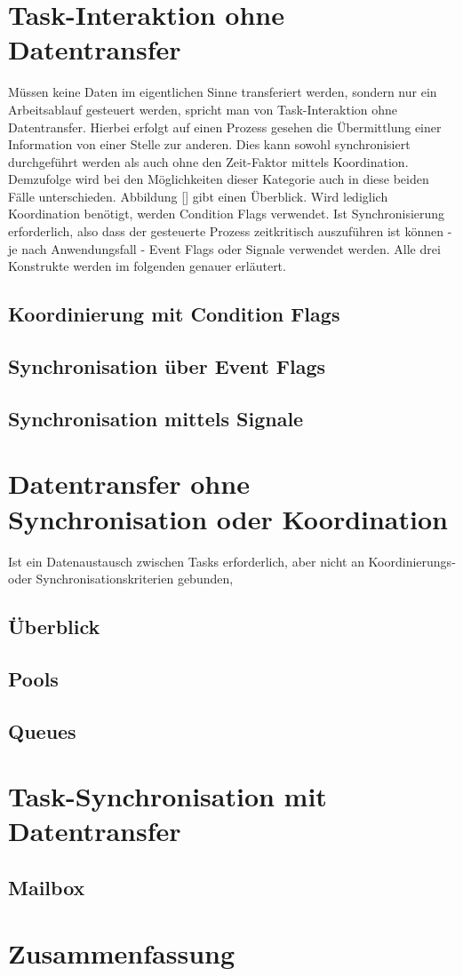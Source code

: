 \documentclass{llncs}
\begin{document}
\section{Task-Interaktion ohne Datentransfer}
Müssen keine Daten im eigentlichen Sinne transferiert werden, sondern nur ein Arbeitsablauf gesteuert werden, spricht man von Task-Interaktion ohne Datentransfer. Hierbei erfolgt auf einen Prozess gesehen die Übermittlung einer Information von einer Stelle zur anderen. Dies kann sowohl synchronisiert durchgeführt werden als auch ohne den Zeit-Faktor mittels Koordination. Demzufolge wird bei den Möglichkeiten dieser Kategorie auch in diese beiden Fälle unterschieden. Abbildung [] gibt einen Überblick. Wird lediglich Koordination benötigt, werden Condition Flags verwendet. Ist Synchronisierung erforderlich, also dass der gesteuerte Prozess zeitkritisch auszuführen ist können - je nach Anwendungsfall - Event Flags oder Signale verwendet werden. Alle drei Konstrukte werden im folgenden genauer erläutert.
\subsection{Koordinierung mit Condition Flags}
\subsection{Synchronisation über Event Flags}
\subsection{Synchronisation mittels Signale}
\section{Datentransfer ohne Synchronisation oder Koordination}
Ist ein Datenaustausch zwischen Tasks erforderlich, aber nicht an Koordinierungs- oder Synchronisationskriterien gebunden, 
\subsection{Überblick}
\subsection{Pools}
\subsection{Queues}
\section{Task-Synchronisation mit Datentransfer}

\subsection{Mailbox}
\section{Zusammenfassung}
\end{document}

